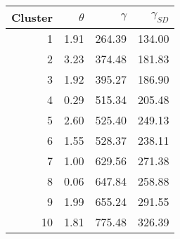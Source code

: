 
\begin{tabular}[t]{rrrr}
\toprule
Cluster & $\theta$ & $\gamma$ & $\gamma_{SD}$\\
\midrule
1 & 1.91 & 264.39 & 134.00\\
2 & 3.23 & 374.48 & 181.83\\
3 & 1.92 & 395.27 & 186.90\\
4 & 0.29 & 515.34 & 205.48\\
5 & 2.60 & 525.40 & 249.13\\
6 & 1.55 & 528.37 & 238.11\\
7 & 1.00 & 629.56 & 271.38\\
8 & 0.06 & 647.84 & 258.88\\
9 & 1.99 & 655.24 & 291.55\\
10 & 1.81 & 775.48 & 326.39\\
\bottomrule
\end{tabular}
